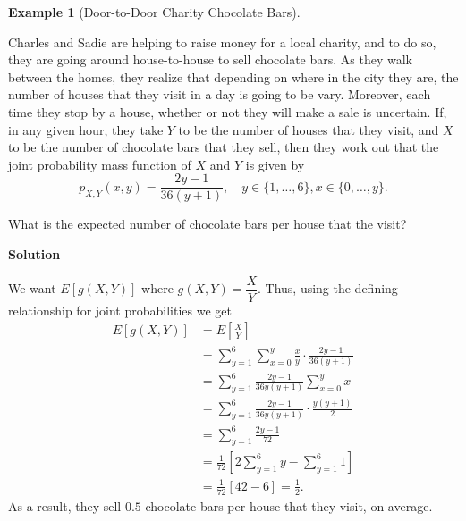 \documentclass[
  letterpaper,
  DIV=11,
  numbers=noendperiod]{scrreprt}
\theoremstyle{definition}
\theoremstyle{definition}
\newtheorem{example}{Example}[chapter]
\theoremstyle{definition}
\theoremstyle{remark}
\begin{document}
\begin{example}[Door-to-Door Charity Chocolate
Bars]\protect\hypertarget{exm-joint-expectation}{}\label{exm-joint-expectation}

Charles and Sadie are helping to raise money for a local charity, and to
do so, they are going around house-to-house to sell chocolate bars. As
they walk between the homes, they realize that depending on where in the
city they are, the number of houses that they visit in a day is going to
be vary. Moreover, each time they stop by a house, whether or not they
will make a sale is uncertain. If, in any given hour, they take \(Y\) to
be the number of houses that they visit, and \(X\) to be the number of
chocolate bars that they sell, then they work out that the joint
probability mass function of \(X\) and \(Y\) is given by
\[p_{X,Y}(x,y) = \frac{2y - 1}{36(y + 1)}, \quad y\in\{1,\dots,6\}, x\in\{0,\dots,y\}.\]

What is the expected number of chocolate bars per house that the visit?

\begin{tcolorbox}[enhanced jigsaw, colback=white, colframe=quarto-callout-color-frame, arc=.35mm, leftrule=.75mm, rightrule=.15mm, opacityback=0, breakable, bottomrule=.15mm, left=2mm, toprule=.15mm]

\vspace{-3mm}\textbf{Solution}\vspace{3mm}

We want \(E[g(X,Y)]\) where \(g(X,Y) = \dfrac{X}{Y}\). Thus, using the
defining relationship for joint probabilities we get \begin{align*}
E[g(X,Y)] &= E\left[\frac{X}{Y}\right] \\
&= \sum_{y=1}^{6}\sum_{x=0}^{y} \frac{x}{y}\cdot\frac{2y - 1}{36(y + 1)} \\
&= \sum_{y=1}^{6}\frac{2y-1}{36y(y + 1)}\sum_{x=0}^{y} x \\
&= \sum_{y=1}^{6}\frac{2y-1}{36y(y + 1)}\cdot\frac{y(y+1)}{2} \\
&= \sum_{y=1}^{6}\frac{2y-1}{72} \\
&= \frac{1}{72}\left[2\sum_{y=1}^{6} y - \sum_{y=1}^6 1\right]\\
&= \frac{1}{72}\left[42 - 6\right] = \frac{1}{2}.
\end{align*} As a result, they sell \(0.5\) chocolate bars per house
that they visit, on average.

\end{tcolorbox}

\end{example}
\end{document}
